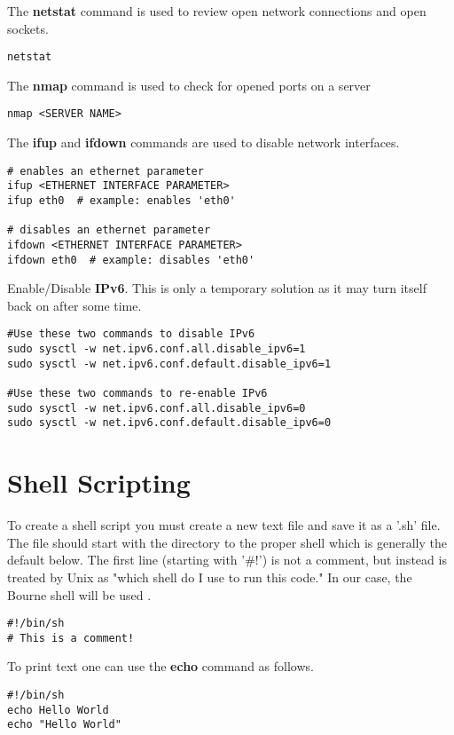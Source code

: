 The \textbf{netstat} command is used to review open network connections and open sockets. 
\begin{lstlisting}
netstat
\end{lstlisting}

The \textbf{nmap} command is used to check for opened ports on a server
\begin{lstlisting}
nmap <SERVER NAME>
\end{lstlisting}

The \textbf{ifup} and \textbf{ifdown} commands are used to disable network interfaces.
\begin{lstlisting}
# enables an ethernet parameter
ifup <ETHERNET INTERFACE PARAMETER>
ifup eth0  # example: enables 'eth0'

# disables an ethernet parameter
ifdown <ETHERNET INTERFACE PARAMETER>
ifdown eth0  # example: disables 'eth0'
\end{lstlisting}

Enable/Disable \textbf{IPv6}. This is only a temporary solution as it may turn itself back on after some time.
\begin{lstlisting}
#Use these two commands to disable IPv6
sudo sysctl -w net.ipv6.conf.all.disable_ipv6=1
sudo sysctl -w net.ipv6.conf.default.disable_ipv6=1

#Use these two commands to re-enable IPv6
sudo sysctl -w net.ipv6.conf.all.disable_ipv6=0
sudo sysctl -w net.ipv6.conf.default.disable_ipv6=0
\end{lstlisting}






\section{Shell Scripting}

To create a shell script you must create a new text file and save it as a '.sh' file. The file should start with the directory to the proper shell which is generally the default below. The first line (starting with '\#!') is not a comment, but instead is treated by Unix as "which shell do I use to run this code." In our case, the Bourne shell will be used \cite{linux: shell scripting}.
\begin{lstlisting}
#!/bin/sh
# This is a comment!
\end{lstlisting}

To print text one can use the \textbf{echo} command as follows.
\begin{lstlisting}
#!/bin/sh
echo Hello World
echo "Hello World"
\end{lstlisting}

